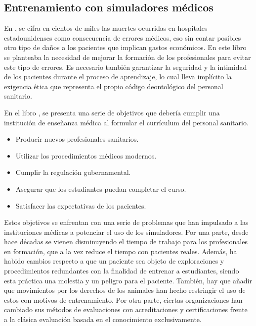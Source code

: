 
\subsection{Entrenamiento con simuladores médicos}
\label{art:entrenamiento}



En \cite{donaldson2000err}, se cifra en cientos de miles las muertes ocurridas en hospitales estadounidenses como consecuencia de errores médicos, eso sin contar posibles otro tipo de daños a los pacientes que implican gastos económicos. En este libro se planteaba la necesidad de mejorar la formación de los profesionales para evitar este tipo de errores. 
Es necesario también garantizar la seguridad y la intimidad de los pacientes durante el proceso de aprendizaje, lo cual lleva implícito la exigencia ética que representa el propio código deontológico del personal sanitario. 

En el libro \cite{dent2017practical}, se presenta una serie de objetivos que debería cumplir una institución de enseñanza médica al formular el currículum del personal sanitario.
\begin{itemize}
    \item Producir nuevos profesionales sanitarios.
    \item Utilizar los procedimientos médicos modernos.
    \item Cumplir la regulación gubernamental.
    \item Asegurar que los estudiantes puedan completar el curso.
    \item Satisfacer las expectativas de los pacientes.
\end{itemize}

Estos objetivos se enfrentan con una serie de problemas que han impulsado a las instituciones médicas a potenciar el uso de los simuladores.
Por una parte,  desde hace décadas se vienen disminuyendo el tiempo de trabajo para los profesionales en formación, que a la vez reduce el tiempo con pacientes reales. Además, ha habido cambios respecto a que un paciente sea objeto de exploraciones y procedimientos redundantes con la finalidad de entrenar a estudiantes, siendo esta práctica una molestia y un peligro para el paciente. También, hay que añadir que movimientos por los derechos de los animales han hecho restringir el uso de estos con motivos de entrenamiento. Por otra parte, ciertas organizaciones han cambiado sus métodos de evaluaciones con acreditaciones y certificaciones frente a la clásica evaluación basada en el conocimiento exclusivamente.

